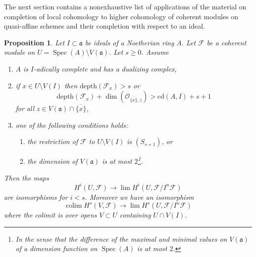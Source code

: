 \documentclass{stacks-project}
\theoremstyle{plain}
\newtheorem{proposition}[subsection]{Proposition}
\theoremstyle{definition}
\theoremstyle{remark}
\numberwithin{equation}{subsection}
\def\lim{\mathop{\mathrm{lim}}\nolimits}
\def\colim{\mathop{\mathrm{colim}}\nolimits}
\def\Spec{\mathop{\mathrm{Spec}}}
\begin{document}
\noindent
The next section contains a nonexhaustive list of
applications of the material
on completion of local cohomology to higher cohomology
of coherent modules on quasi-affine schemes and their
completion with respect to an ideal.

\begin{proposition}
\label{proposition-application-higher}
Let $I \subset \mathfrak a$ be ideals of a Noetherian ring $A$.
Let $\mathcal{F}$ be a coherent module on
$U = \Spec(A) \setminus V(\mathfrak a)$.
Let $s \geq 0$.
Assume
\begin{enumerate}
\item $A$ is $I$-adically complete and has a dualizing complex,
\item if $x \in U \setminus V(I)$ then
$\text{depth}(\mathcal{F}_x) > s$ or
$$
\text{depth}(\mathcal{F}_x) +
\dim(\mathcal{O}_{\overline{\{x\}}, z}) > \text{cd}(A, I) + s + 1
$$
for all $z \in V(\mathfrak a) \cap \overline{\{x\}}$,
\item one of the following conditions holds:
\begin{enumerate}
\item the restriction of $\mathcal{F}$ to $U \setminus V(I)$
is $(S_{s + 1})$, or
\item the dimension of $V(\mathfrak a)$ is at most $2$\footnote{In
the sense that the difference of the maximal and minimal values
on $V(\mathfrak a)$ of a dimension function on $\Spec(A)$ is at most $2$.}.
\end{enumerate}
\end{enumerate}
Then the maps
$$
H^i(U, \mathcal{F})
\longrightarrow
\lim H^i(U, \mathcal{F}/I^n\mathcal{F})
$$
are isomorphisms for $i < s$. Moreover we have an isomorphism
$$
\colim H^s(V, \mathcal{F})
\longrightarrow
\lim H^s(U, \mathcal{F}/I^n\mathcal{F})
$$
where the colimit is over opens $V \subset U$ containing $U \cap V(I)$.
\end{proposition}
\end{document}
